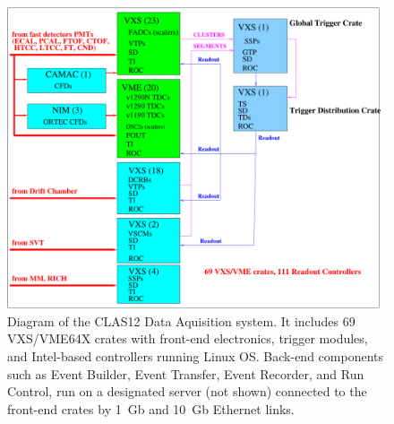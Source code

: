 \begin{figure}[hbt]
	\centering
	\includegraphics[width=1.0\columnwidth,keepaspectratio]{img/CLAS12_HARDWARE_2.pdf}
	\caption{Diagram of the CLAS12 Data Aquisition system. It includes 69 VXS/VME64X crates with front-end electronics, trigger modules, and Intel-based controllers running Linux OS. Back-end components such as Event Builder, Event Transfer, Event Recorder, and Run Control, run on a designated server (not shown) connected to the front-end crates by 1~Gb and 10~Gb Ethernet links.}
	\label{fig:DAQdiagram}
\end{figure}

